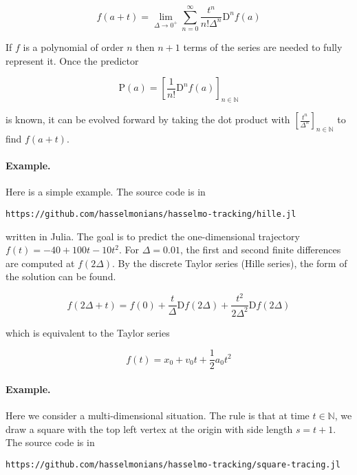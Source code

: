 \documentclass[]{article}
\begin{document}
\begin{equation}
	f(a + t) = \lim_{\Delta \rightarrow 0^+} \sum_{n=0}^{\infty} \frac{t^n}{n! \Delta^n} \mathrm{D}^n f(a)
\end{equation}

If $f$ is a polynomial of order $n$ then $n+1$ terms of the series are needed to fully represent it. Once the predictor

\begin{equation}
	\mathrm{P}(a) = \left[ \frac{1}{n!} \mathrm{D}^n f(a) \right]_{n \in \mathbb{N}}
\end{equation}

is known, it can be evolved forward by taking the dot product with $\left[ \frac{t^n}{\Delta^n} \right]_{n \in \mathbb{N}}$ to find $f(a + t)$.

\paragraph{Example.} Here is a simple example. The source code is in 

\texttt{https://github.com/hasselmonians/hasselmo-tracking/hille.jl} 

written in Julia. The goal is to predict the one-dimensional trajectory $f(t) = -40 + 100 t - 10 t^2$. For $\Delta = 0.01$, the first and second finite differences are computed at $f(2\Delta)$. By the discrete Taylor series (Hille series), the form of the solution can be found.

\begin{equation}
	f(2\Delta + t) = f(0) + \frac{t}{\Delta} \mathrm{D}f(2\Delta) + \frac{t^2}{2 \Delta^2} \mathrm{D}f(2\Delta)
\end{equation}

which is equivalent to the Taylor series

\begin{equation}
	f(t) = x_0 + v_0 t + \frac{1}{2} a_0 t^2
\end{equation}

\paragraph{Example.} Here we consider a multi-dimensional situation. The rule is that at time $t \in \mathbb{N}$, we draw a square with the top left vertex at the origin with side length $s = t + 1$. The source code is in

\texttt{https://github.com/hasselmonians/hasselmo-tracking/square-tracing.jl}
\end{document}
